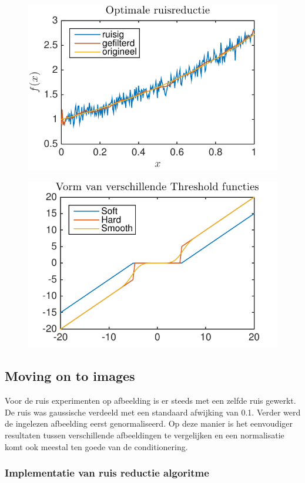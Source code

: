 \begin{figure}
\centering
\includegraphics[width=0.7\linewidth]{../src/denoising/error_1d/Optimale_ruisReductie}
\caption{}
\label{fig:Optimale_ruisReductie}
\end{figure}

\begin{figure}
\centering
\includegraphics[width=0.7\linewidth]{../src/denoising/error_1d/Threshold}
\caption{}
\label{fig:Threshold}
\end{figure}






\subsection{Moving on to images}

Voor de ruis experimenten op afbeelding is er steeds met een zelfde ruis gewerkt.
De ruis was gaussische verdeeld met een standaard afwijking van 0.1.
Verder werd de ingelezen afbeelding eerst genormaliseerd.
Op deze manier is het eenvoudiger resultaten tussen verschillende afbeeldingen te vergelijken en een normalisatie komt ook meestal ten goede van de conditionering.

\subsubsection{Implementatie van ruis reductie algoritme}


